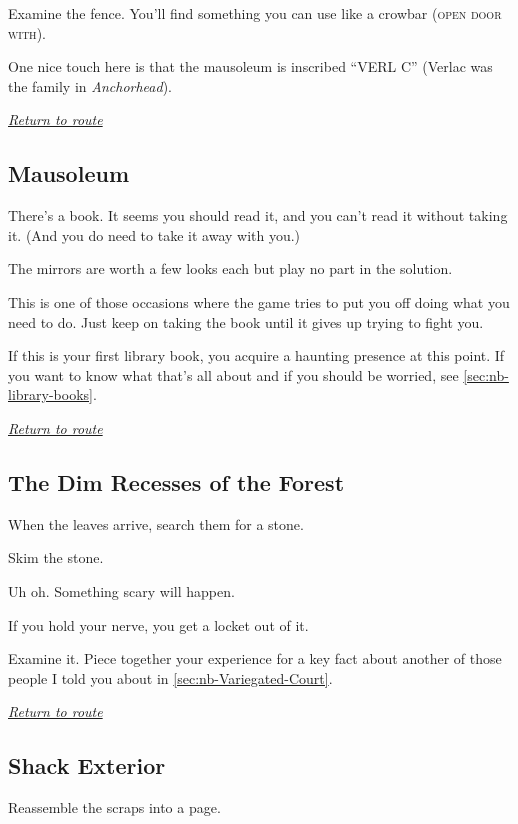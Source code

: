 \documentclass[a5paper]{extarticle}
\begin{document}
Examine the fence. You'll find something you can use like a crowbar (\textsc{open door with}).

One nice touch here is that the mausoleum is inscribed \enquote{VERL C}
(Verlac was the family in \emph{Anchorhead}).

\hyperref[sec:route]{\emph{Return to route}}

\newpage
\subsection{Mausoleum}\label{sec:sol-Mausoleum}

There's a book. It seems you should read it, and you can't read it without taking it.
(And you do need to take it away with you.)

The mirrors are worth a few looks each but play no part in the solution.

This is one of those occasions where the game tries to put you off doing what you need to do.
Just keep on taking the book until it gives up trying to fight you.

If this is your first library book, you acquire a haunting presence at this point.
If you want to know what that's all about and if you should be worried,
see \cref{sec:nb-library-books}.

\hyperref[sec:route]{\emph{Return to route}}

\newpage
\subsection{The Dim Recesses of the Forest}\label{sec:sol-The-Dim-Recesses-of-the-Forest}

When the leaves arrive, search them for a stone.

Skim the stone.

Uh oh. Something scary will happen.

If you hold your nerve, you get a locket out of it.

Examine it. Piece together your experience for a key fact about another of those
people I told you about in \cref{sec:nb-Variegated-Court}.

\hyperref[sec:route-1]{\emph{Return to route}}

\newpage
\subsection{Shack Exterior}\label{sec:sol-Shack-Exterior-0}

Reassemble the scraps into a page.
\end{document}
